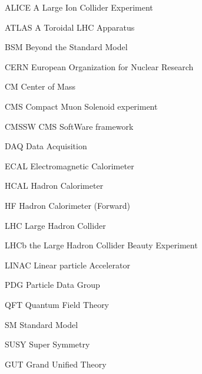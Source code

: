 \begin{glossary}
\item[ALICE] A Large Ion Collider Experiment
\item[ATLAS] A Toroidal LHC Apparatus
\item[BSM] Beyond the Standard Model
\item[CERN] European Organization for Nuclear Research
\item[CM] Center of Mass
\item[CMS] Compact Muon Solenoid experiment
\item[CMSSW] CMS SoftWare framework
\item[DAQ] Data Acquisition
\item[ECAL] Electromagnetic Calorimeter
\item[HCAL] Hadron Calorimeter
\item[HF] Hadron Calorimeter (Forward)
\item[LHC] Large Hadron Collider
\item[LHCb] the Large Hadron Collider Beauty Experiment
\item[LINAC] Linear particle Accelerator
\item[PDG] Particle Data Group
\item[QFT] Quantum Field Theory
\item[SM] Standard Model
\item[SUSY] Super Symmetry
\item[GUT] Grand Unified Theory
\end{glossary}

